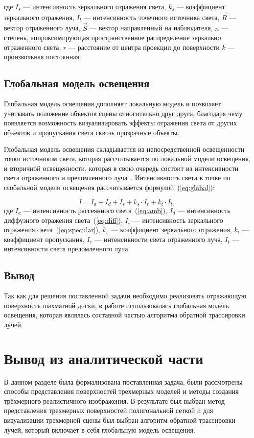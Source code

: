 \begin{enumerate}[label=\arabic*)]
	\noindent где 
	$I_{s}$ --- интенсивность зеркального отражения света,
	$k_{s}$ --- коэффициент зеркального отражения,
	$I_{l}$ --- интенсивность точечного источника света,
	$\overrightarrow{R}$ --- вектор отраженного луча, 
	$\overrightarrow{S}$ --- вектор направленный на наблюдателя,
	$n$ ---  степень, аппроксимирующая пространственное распределение зеркально отраженного света,
	$r$ --- расстояние от центра проекции до поверхности
	$k$ --- произвольная постоянная.
	
	
\end{enumerate}

\subsection{Глобальная модель освещения}
Глобальная модель освещения дополняет локальную модель и позволяет учитывать положение объектов сцены относительно друг друга, благодаря чему появляется возможность визуализировать эффекты отражения света от других объектов и пропускания света сквозь прозрачные объекты.

Глобальная модель освещения складывается из непосредственной освещенности точки источником света, которая рассчитывается по локальной модели освещения, и вторичной освещенности, которая в свою очередь состоит из интенсивности света отраженного и преломленного луча~\cite{shikin2001}. Интенсивность света в точке по глобальной модели освещения рассчитывается  формулой~(\ref{eq:global}):

\begin{equation}\label{eq:global}
	I = I_{a} + I_{d} + I_{s} + k_{s} \cdot I_{r} + k_{t} \cdot I_{t},
\end{equation}
\noindent где 
	$I_{a}$ --- интенсивность рассеянного света~(\ref{eq:amb}), 
	$I_{d}$ --- интенсивность диффузного отражения света~(\ref{eq:diff}), 
	$I_{s}$ --- интенсивность зеркального отражения света~(\ref{eq:specular}),
	$k_{s}$ --- коэффициент зеркального отражения,
	$k_{t}$ --- коэффициент пропускания,
	$I_{r}$ --- интенсивности света отраженного луча,
	$I_{t}$ --- интенсивности света преломленного луча.
\subsection*{Вывод}
Так как для решения поставленной задачи необходимо реализовать отражающую поверхность шахматной доски, в работе использовалась глобальная модель освещения, которая являлась составной частью алгоритма обратной трассировки лучей.


\section*{Вывод из аналитической части}
В данном разделе была формализована поставленная задача, были рассмотрены способы представления поверхностей трехмерных моделей и методы создания трёхмерного реалистичного изображения. В результате был выбран метод представления трехмерных поверхностей полигональной сеткой и для визуализации трехмерной сцены был выбран алгоритм обратной трассировки лучей, который включает в себя глобальную модель освещения.

\clearpage
